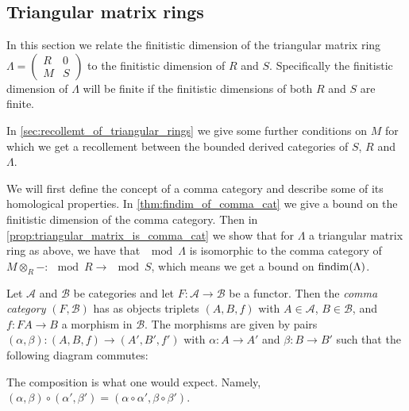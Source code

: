 \subsection{Triangular matrix rings}\label{sec:Triangular_matrix_rings}

In this section we relate the finitistic dimension of the triangular matrix ring $\Lambda = \begin{pmatrix}
R & 0\\
M& S
\end{pmatrix}$ to the finitistic dimension of $R$ and $S$. Specifically the finitistic dimension of $\Lambda$ will be finite if the finitistic dimensions of both $R$ and $S$ are finite. 

In \cref{sec:recollemt_of_triangular_rings} we give some further conditions on $M$ for which we get a recollement between the bounded derived categories of $S$, $R$ and $\Lambda$.

We will first define the concept of a comma category and describe some of its homological properties. In \cref{thm:findim_of_comma_cat} we give a bound on the finitistic dimension of the comma category. Then in \cref{prop:triangular_matrix_is_comma_cat} we show that for $\Lambda$ a triangular matrix ring as above, we have that $\mod \Lambda$ is isomorphic to the comma category of $M\otimes_R - \colon \mod R \to \mod S$, which means we get a bound on $\operatorname{findim}(\Lambda)$.

\begin{defn}
	Let $\mathcal A$ and $\mathcal B$ be categories and let $F\colon\mathcal A \to \mathcal B$ be a functor. Then the \emph{comma category} $(F, \mathcal  B)$ has as objects triplets $(A, B, f)$ with $A \in \mathcal  A$, $B \in \mathcal  B$, and $f\colon FA \to B$ a morphism in $\mathcal  B$. The morphisms are given by pairs $(\alpha, \beta)\colon(A, B, f) \to (A', B', f')$ with $\alpha\colon A \to A'$ and $\beta\colon B \to B'$ such that the following diagram commutes:
	\begin{center}
	\end{center}
	The composition is what one would expect. Namely, $(\alpha, \beta) \circ (\alpha', \beta') = (\alpha \circ \alpha ', \beta \circ \beta')$.
\end{defn}

